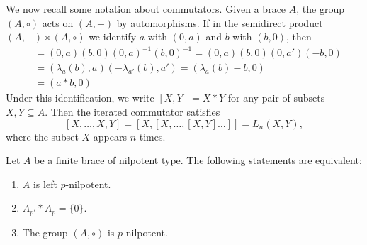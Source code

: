 We now recall some notation about commutators. Given a brace $A$, the group $(A,\circ)$ acts on $(A,+)$ by automorphisms. 
If in the semidirect product $(A,+)\rtimes(A,\circ)$ we identify $a$ with $(0,a)$ and $b$ with $(b,0)$, then 
\begin{align*}
 [a,b] &= (0,a)(b,0)(0,a)^{-1}(b,0)^{-1} = (0,a)(b,0)(0,a')(-b,0) \\
 &=(\lambda_a(b),a)(-\lambda_{a'}(b),a') = (\lambda_a(b)-b,0) \\
 &= (a*b,0)
\end{align*}
Under this identification, we write $[X,Y]=X*Y$ for any pair of subsets $X,Y\subseteq A$. Then the iterated commutator  
satisfies 
\[
[X,\dots, X,Y]=[X,[X,\dots,[X,Y]\dots]]=L_n(X,Y),
\]
where the subset $X$ appears $n$ times.

\begin{theorem}
\label{thm:left_p}
    Let $A$ be a finite brace of nilpotent type. The following statements
    are equivalent:
    \begin{enumerate}
        \item $A$ is left $p$-nilpotent.
        \item $A_{p'}*A_p=\{0\}$.
        \item The group $(A,\circ)$ is $p$-nilpotent.
    \end{enumerate}
\end{theorem}


